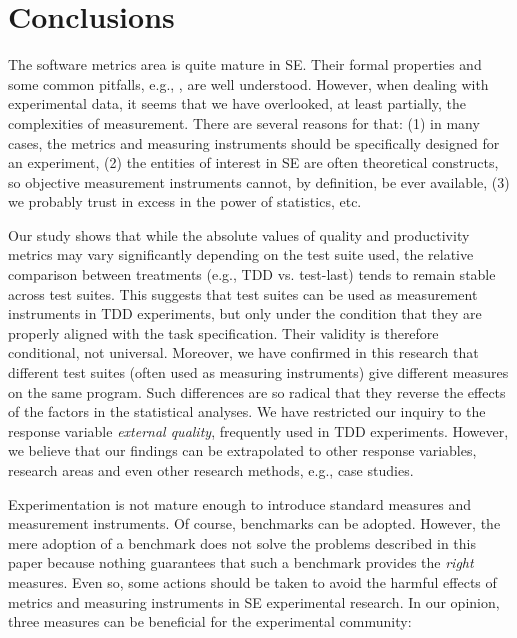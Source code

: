 \section{Conclusions}\label{sec:conclusions}

The software metrics area is quite mature in SE. Their formal properties \cite{fenton2014software} and some common pitfalls, e.g., \cite{fenton1992software}, are well understood. However, when dealing with experimental data, it seems that we have overlooked, at least partially, the complexities of measurement. There are several reasons for that: (1) in many cases, the metrics and measuring instruments should be specifically designed for an experiment, (2) the entities of interest in SE are often theoretical constructs, so objective measurement instruments cannot, by definition, be ever available, (3) we probably trust in excess in the power of statistics, etc.

Our study shows that while the absolute values of quality and productivity metrics may vary significantly depending on the test suite used, the relative comparison between treatments (e.g., TDD vs. test-last) tends to remain stable across test suites. This suggests that test suites can be used as measurement instruments in TDD experiments, but only under the condition that they are properly aligned with the task specification. Their validity is therefore conditional, not universal. Moreover, we have confirmed in this research that different test suites (often used as measuring instruments) give different measures on the same program. Such differences are so radical that they reverse the effects of the factors in the statistical analyses. We have restricted our inquiry to the response variable \textit{external quality}, frequently used in TDD experiments. However, we believe that our findings can be extrapolated to other response variables, research areas and even other research methods, e.g., case studies.

Experimentation is not mature enough to introduce standard measures and measurement instruments. Of course, benchmarks can be adopted. However, the mere adoption of a benchmark does not solve the problems described in this paper because nothing guarantees that such a benchmark provides the \textit{right} measures. Even so, some actions should be taken to avoid the harmful effects of metrics and measuring instruments in SE experimental research. In our opinion, three measures can be beneficial for the experimental community:

